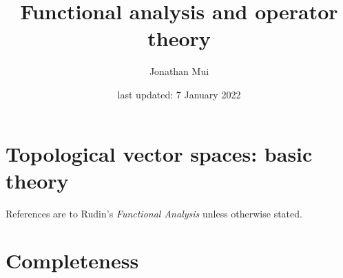 \documentclass[11pt]{article}
\title{Functional analysis and operator theory}
\author{Jonathan Mui}
\date{last updated: 7 January 2022}
\begin{document}
	
	\maketitle
	
	\tableofcontents
	
	\section{Topological vector spaces: basic theory}
	References are to Rudin's \emph{Functional Analysis} unless otherwise stated.
	
	
	\section{Completeness}
	
	
\end{document}
